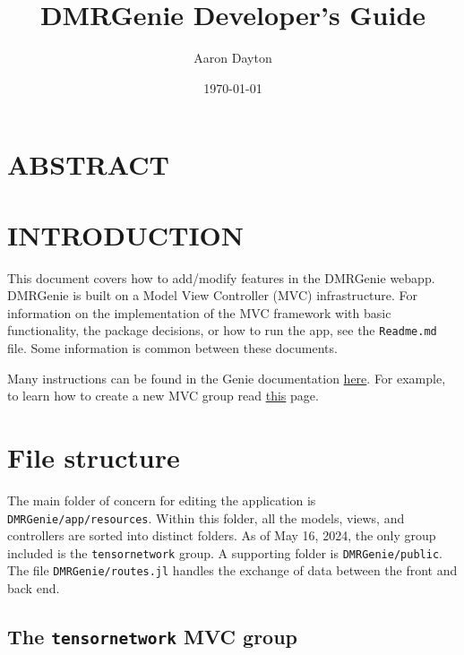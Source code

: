 \documentclass{article}
\title{DMRGenie Developer's Guide}
\author{Aaron Dayton}
\date{\today}
\begin{document}
\maketitle
\thispagestyle{fancy}
\clearpage
\tableofcontents
\thispagestyle{fancy}

\clearpage
\fancyhead[C]{\thepage}

\section{ABSTRACT}

\linebreak
\begin{multicols}{2}
\section{INTRODUCTION}

This document covers how to add/modify features in the DMRGenie webapp. DMRGenie is built on a Model View Controller (MVC) infrastructure. For information on the implementation of the MVC framework with basic functionality, the package decisions, or how to run the app, see the \lstinline|Readme.md| file. Some information is common between these documents.

Many instructions can be found in the Genie documentation \href{https://genieframework.github.io/Genie.jl/dev}{here}. For example, to learn how to create a new MVC group read \href{https://genieframework.github.io/Genie.jl/dev/tutorials/4-1--Developing_MVC_Web_Apps.html}{this} page.

\section{File structure}

The main folder of concern for editing the application is \lstinline|DMRGenie/app/resources|. Within this folder, all the models, views, and controllers are sorted into distinct folders. As of May 16, 2024, the only group included is the \lstinline|tensornetwork| group. A supporting folder is \lstinline|DMRGenie/public|. The file \lstinline|DMRGenie/routes.jl| handles the exchange of data between the front and back end.

\subsection{The \lstinline|tensornetwork| MVC group}


\end{multicols}
\end{document}
